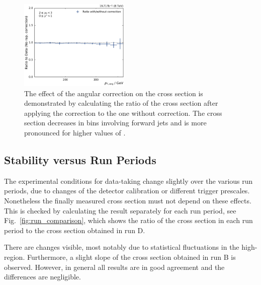 \begin{figure}[htbp]
    \includegraphics[width=0.47\textwidth]{figures/measurement/rap_corr_data_yb2ys0.pdf}
    \caption[Effect of angular correction]{The effect of the angular correction
        on the cross section  is demonstrated by calculating the ratio of the
        cross section after applying the correction to the one without
        correction. The cross section decreases in bins involving forward jets
        and is more pronounced for higher values of \ystar.}
    \label{fig:rap_corr_data}
\end{figure}

\subsection{Stability versus Run Periods}

The experimental conditions for data-taking change slightly over the various run
periods, due to changes of the detector calibration or different trigger
prescales. Nonetheless the finally measured cross section must not depend on
these effects. This is checked by calculating the result separately for each run
period, see Fig.~\ref{fig:run_comparison}, which shows the ratio of the cross
section in each run period to the cross section obtained in run D. 

There are changes visible, most notably due to statistical fluctuations in the
high-\pt region. Furthermore, a slight slope of the cross section obtained in run
B is observed. However, in general all results are in good agreement and the
differences are negligible.

